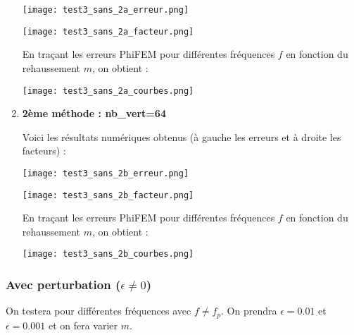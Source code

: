\begin{enumerate}[label=\textbullet]
	\begin{minipage}{0.48\linewidth}
		\centering
		\texttt{[image: test3\_sans\_2a\_erreur.png]}
	\end{minipage}
	\begin{minipage}{0.48\linewidth}
		\centering
		\texttt{[image: test3\_sans\_2a\_facteur.png]}
	\end{minipage}
	
	En traçant les erreurs PhiFEM pour différentes fréquences $f$ en fonction du rehaussement $m$, on obtient :
	
	\begin{minipage}{\linewidth}
		\centering
		\texttt{[image: test3\_sans\_2a\_courbes.png]}
	\end{minipage}
	
	\newpage
	\item \textbf{2ème méthode : nb\_vert=64}
	
	Voici les résultats numériques obtenus (à gauche les erreurs et à droite les facteurs) :
	
	\begin{minipage}{0.48\linewidth}
		\centering
		\texttt{[image: test3\_sans\_2b\_erreur.png]}
	\end{minipage}
	\begin{minipage}{0.48\linewidth}
		\centering
		\texttt{[image: test3\_sans\_2b\_facteur.png]}
	\end{minipage}
	
	En traçant les erreurs PhiFEM pour différentes fréquences $f$ en fonction du rehaussement $m$, on obtient :
	
	\begin{minipage}{\linewidth}
		\centering
		\texttt{[image: test3\_sans\_2b\_courbes.png]}
	\end{minipage}
	
\end{enumerate}


\subsubsection*{Avec perturbation ($\epsilon\ne 0$)}


On testera pour différentes fréquences avec $f\ne f_p$. On prendra $\epsilon=0.01$ et $\epsilon=0.001$ et on fera varier $m$.

